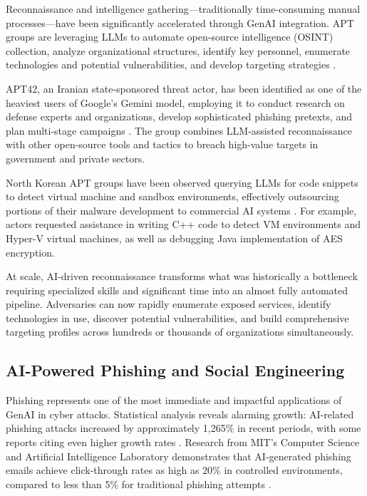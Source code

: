 Reconnaissance and intelligence gathering---traditionally time-consuming manual processes---have been significantly accelerated through GenAI integration. APT groups are leveraging LLMs to automate open-source intelligence (OSINT) collection, analyze organizational structures, identify key personnel, enumerate technologies and potential vulnerabilities, and develop targeting strategies \cite{deepinstinct2025}.

APT42, an Iranian state-sponsored threat actor, has been identified as one of the heaviest users of Google's Gemini model, employing it to conduct research on defense experts and organizations, develop sophisticated phishing pretexts, and plan multi-stage campaigns \cite{deepinstinct2025}. The group combines LLM-assisted reconnaissance with other open-source tools and tactics to breach high-value targets in government and private sectors.

North Korean APT groups have been observed querying LLMs for code snippets to detect virtual machine and sandbox environments, effectively outsourcing portions of their malware development to commercial AI systems \cite{google2025}. For example, actors requested assistance in writing C++ code to detect VM environments and Hyper-V virtual machines, as well as debugging Java implementation of AES encryption.

At scale, AI-driven reconnaissance transforms what was historically a bottleneck requiring specialized skills and significant time into an almost fully automated pipeline. Adversaries can now rapidly enumerate exposed services, identify technologies in use, discover potential vulnerabilities, and build comprehensive targeting profiles across hundreds or thousands of organizations simultaneously.

\subsection{AI-Powered Phishing and Social Engineering}

Phishing represents one of the most immediate and impactful applications of GenAI in cyber attacks. Statistical analysis reveals alarming growth: AI-related phishing attacks increased by approximately 1,265\% in recent periods, with some reports citing even higher growth rates \cite{deepstrike2025}. Research from MIT's Computer Science and Artificial Intelligence Laboratory demonstrates that AI-generated phishing emails achieve click-through rates as high as 20\% in controlled environments, compared to less than 5\% for traditional phishing attempts \cite{reddit2025}.

